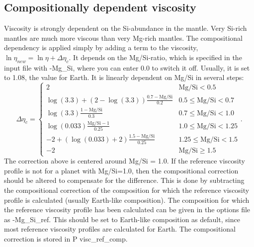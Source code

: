 \documentclass[12pt,notitlepage]{article}
\begin{document}
\subsection{Compositionally dependent viscosity}
Viscosity is strongly dependent on the Si-abundance in the mantle. Very Si-rich mantles are much more viscous than very Mg-rich mantles. The compositional dependency is applied simply by adding a term to the viscosity, $\ln \eta_{new} = \ln \eta + \Delta \eta_c$. It depends on the Mg/Si-ratio, which is specified in the input file with -Mg\_Si, where you can enter 0.0 to switch it off. Usually, it is set to 1.08, the value for Earth. It is linearly dependent on Mg/Si in several steps:
\begin{equation}
\Delta \eta_c = 
\begin{cases}
2 & \text{Mg/Si} < 0.5 \\
\log(3.3) + (2 - \log(3.3))\frac{0.7 - \text{Mg/Si}}{0.2} & 0.5 \leq \text{Mg/Si} < 0.7 \\
\log(3.3)\frac{1 - \text{Mg/Si}}{0.3} & 0.7 \leq \text{Mg/Si} < 1.0 \\
\log(0.033)\frac{\text{Mg/Si}-1}{0.25} & 1.0 \leq \text{Mg/Si} < 1.25 \\
-2 + (\log(0.033) + 2)\frac{1.5 - \text{Mg/Si}}{0.25} & 1.25 \leq \text{Mg/Si} < 1.5 \\
-2 & \text{Mg/Si} \geq 1.5
\end{cases}.
\end{equation}
The correction above is centered around Mg/Si = 1.0. If the reference viscosity profile is not for a planet with Mg/Si=1.0, then the compositional correction should be altered to compensate for the difference. This is done by subtracting the compositional correction of the composition for which the reference viscosity profile is calculated (usually Earth-like composition). The composition for which the reference viscosity profile has been calculated can be given in the options file as -Mg\_Si\_ref. This should be set to Earth-like composition as default, since most reference viscosity profiles are calculated for Earth. The compositional correction is stored in P visc\_ref\_comp.
\end{document}
